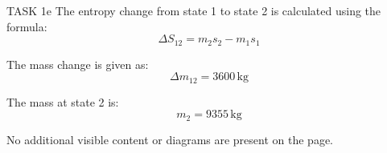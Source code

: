TASK 1e  
The entropy change from state 1 to state 2 is calculated using the formula:  
\[
\Delta S_{12} = m_2 s_2 - m_1 s_1
\]  

The mass change is given as:  
\[
\Delta m_{12} = 3600 \, \text{kg}
\]  

The mass at state 2 is:  
\[
m_2 = 9355 \, \text{kg}
\]  

No additional visible content or diagrams are present on the page.